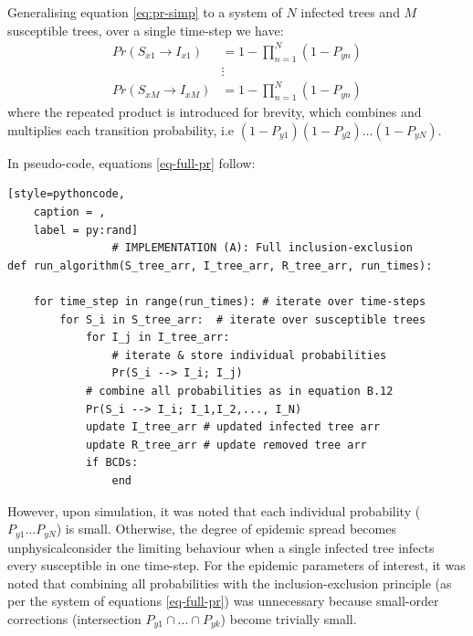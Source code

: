 Generalising equation \ref{eq:pr-simp} to a system of $N$ infected trees and $M$ susceptible trees, over a single time-step we have:
\begin{equation} \label{eq-full-pr}
\begin{split}
Pr(S_{x1} \rightarrow I_{x1}) & = 1 - \prod_{n=1}^{N}(1 - P_{yn})\\
&\vdots \\
Pr(S_{xM} \rightarrow I_{xM}) & = 1 - \prod_{n=1}^{N}(1 - P_{yn})
\end{split}
\end{equation}
where the repeated product is introduced for brevity, which combines and multiplies each transition probability, i.e $(1 - P_{y1})(1 - P_{y2})  \hdots (1 - P_{yN})$. 

In pseudo-code, equations \ref{eq-full-pr} follow:
\begin{lstlisting}[style=pythoncode,
    caption = ,
    label = py:rand]
                # IMPLEMENTATION (A): Full inclusion-exclusion
def run_algorithm(S_tree_arr, I_tree_arr, R_tree_arr, run_times):
    
    for time_step in range(run_times): # iterate over time-steps
        for S_i in S_tree_arr:  # iterate over susceptible trees 
            for I_j in I_tree_arr:
                # iterate & store individual probabilities
                Pr(S_i --> I_i; I_j) 
            # combine all probabilities as in equation B.12
            Pr(S_i --> I_i; I_1,I_2,..., I_N)
            update I_tree_arr # updated infected tree arr
            update R_tree_arr # update removed tree arr
            if BCDs:
                end
\end{lstlisting}
However, upon simulation, it was noted that each individual probability ($P_{y1}...P_{yN}$) is small.
Otherwise, the degree of epidemic spread becomes unphysical\textemdash consider the limiting behaviour when a single infected tree infects every susceptible in one time-step. 
For the epidemic parameters of interest, it was noted that combining all probabilities with the inclusion-exclusion principle (as per the system of equations \ref{eq-full-pr}) was unnecessary
because small-order corrections (intersection $P_{y1} \cap ... \cap P_{yk}$) become trivially small. 

